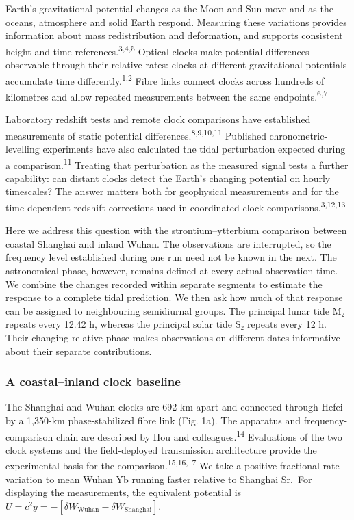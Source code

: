\documentclass[
  12pt,
  a4paper,
]{article}
\begin{document}
\clearpage

Earth's gravitational potential changes as the Moon and Sun move and as
the oceans, atmosphere and solid Earth respond. Measuring these
variations provides information about mass redistribution and
deformation, and supports consistent height and time
references.\textsuperscript{3,4,5} Optical clocks make potential
differences observable through their relative rates: clocks at different
gravitational potentials accumulate time
differently.\textsuperscript{1,2} Fibre links connect clocks across
hundreds of kilometres and allow repeated measurements between the same
endpoints.\textsuperscript{6,7}

Laboratory redshift tests and remote clock comparisons have established
measurements of static potential differences.\textsuperscript{8,9,10,11}
Published chronometric-levelling experiments have also calculated the
tidal perturbation expected during a comparison.\textsuperscript{11}
Treating that perturbation as the measured signal tests a further
capability: can distant clocks detect the Earth's changing potential on
hourly timescales? The answer matters both for geophysical measurements
and for the time-dependent redshift corrections used in coordinated
clock comparisons.\textsuperscript{3,12,13}

Here we address this question with the strontium--ytterbium comparison
between coastal Shanghai and inland Wuhan. The observations are
interrupted, so the frequency level established during one run need not
be known in the next. The astronomical phase, however, remains defined
at every actual observation time. We combine the changes recorded within
separate segments to estimate the response to a complete tidal
prediction. We then ask how much of that response can be assigned to
neighbouring semidiurnal groups. The principal lunar tide M₂ repeats
every 12.42 h, whereas the principal solar tide S₂ repeats every 12 h.
Their changing relative phase makes observations on different dates
informative about their separate contributions.

\hypertarget{a-coastalinland-clock-baseline}{%
\subsubsection{A coastal--inland clock
baseline}\label{a-coastalinland-clock-baseline}}

The Shanghai and Wuhan clocks are 692 km apart and connected through
Hefei by a 1,350-km phase-stabilized fibre link (Fig. 1a). The apparatus
and frequency-comparison chain are described by Hou and
colleagues.\textsuperscript{14} Evaluations of the two clock systems and
the field-deployed transmission architecture provide the experimental
basis for the comparison.\textsuperscript{15,16,17} We take a positive
fractional-rate variation to mean Wuhan Yb running faster relative to
Shanghai Sr.~For displaying the measurements, the equivalent potential
is \(U=c^2y=-[\delta W_{\mathrm{Wuhan}}-\delta W_{\mathrm{Shanghai}}]\).
\end{document}
